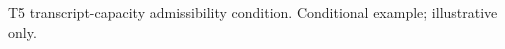 \begin{example}
\par
\Deps T5 transcript-capacity admissibility condition.
\Status Conditional example; illustrative only.

\end{example}
